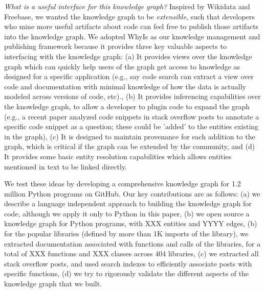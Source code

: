 \textit{What is a useful interface for this knowledge graph?}
Inspired by Wikidata and Freebase, we wanted the knowledge graph to be \textit{extensible}, such that developers who mine more useful artifacts about code can feel free to publish those artifacts into the knowledge graph.  We adopted WhyIs \cite{} as our knowledge management and publishing framework because it provides three key valuable aspects to interfacing with the knowledge graph: (a) It provides views over the knowledge graph which can quickly help users of the graph get access to knowledge as designed for a specific application (e.g., say code search can extract a view over code and documentation with minimal knowledge of how the data is actually modeled across versions of code, etc)., (b) It provides inferencing capabilities over the knowledge graph, to allow a developer to plugin code to expand the graph (e.g., a recent paper analyzed code snippets in stack overflow posts to annotate a specific code snippet as a question; these could be 'added' to the entities existing in the graph), (c) It is designed to maintain provenance for each addition to the graph, which is critical if the graph can be extended by the community, and (d) It provides some basic entity resolution capabilities which allows entities mentioned in text to be linked directly.

We test these ideas by developing a comprehensive knowledge graph for 1.2 million Python programs on GitHub.  Our key contributions are as follows: (a) we describe a language independent approach to building the knowledge graph for code, although we apply it only to Python in this paper, (b) we open source a knowledge graph for Python programs, with XXX entities and YYYY edges, (b) for the popular libraries (defined by more than 1K imports of the library), we extracted documentation associated with functions and calls of the libraries, for a total of XXX functions and XXX classes across 404 libraries, (c) we extracted all stack overflow posts, and used search indexes to efficiently associate posts with specific functions, (d) we try to rigorously validate the different aspects of the knowledge graph that we built. 

